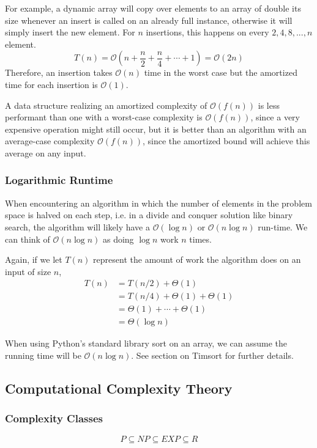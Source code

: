 \documentclass{article}
\newcommand{\bigO}{\mathcal{O}}
\begin{document}
    For example, a dynamic array will copy over elements to an array of double its size whenever an insert is called on an already full instance, otherwise it will simply insert the new element. For $n$ insertions, this happens on every $2, 4, 8, ..., n$ element.
    \[
        T(n) = \bigO ( n + \frac{n}{2} + \frac{n}{4} + \cdots + 1) 
        = \bigO(2n) 
    \]
    Therefore, an insertion takes $\bigO(n)$ time in the worst case but the amortized time for each insertion is $\bigO(1)$.
    
    A data structure realizing an amortized complexity of $\bigO (f(n))$ is less performant than one with a worst-case complexity is $\bigO(f(n))$, since a very expensive operation might still occur, but it is better than an algorithm with an average-case complexity $\bigO(f(n))$, since the amortized bound will achieve this average on any input.
    
    \subsubsection{Logarithmic Runtime}
    When encountering an algorithm in which the number of elements in the problem space is halved on each step, i.e. in a divide and conquer solution like binary search, the algorithm will likely have a $\bigO(\log n)$ or $\bigO(n \log n)$ run-time. We can think of $\bigO(n \log n)$ as doing $\log n$ work $n$ times. 
    
    Again, if we let $T(n)$ represent the amount of work the algorithm does on an input of size $n$,
    \begin{align*}
        T(n) &= T(n/2) + \Theta(1) \\
        &=  T(n/4)+ \Theta(1) + \Theta(1) \\ 
        &= \Theta(1) + \cdots + \Theta(1) \\
        &= \Theta(\log n ) 
    \end{align*}
    
    When using Python's standard library sort on an array, we can assume the running time will be $\bigO (n \log n)$. See section on Timsort for further details.
    
    \subsection{Computational Complexity Theory}
    \subsubsection{Complexity Classes}
    \[
        P \subseteq NP \subseteq EXP \subseteq R
    \]
    
\end{document}
